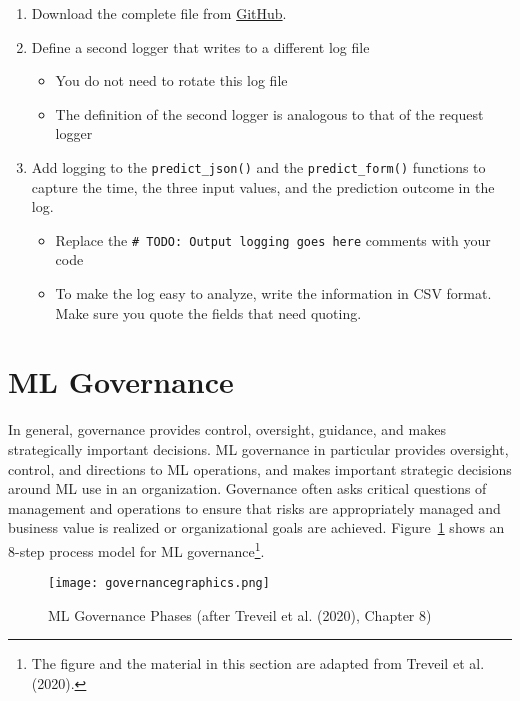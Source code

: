 \begin{exercisebox}
\begin{enumerate}
\item Download the complete file from \href{https://github.com/jevermann/busi4720-mlops/blob/main/flask_deploy_logging.py}{GitHub}.
\item Define a second logger that writes to a different log file
\begin{itemize}
  \item You do not need to rotate this log file
  \item The definition of the second logger is analogous to that of the request logger
\end{itemize}
\item Add logging to the \texttt{predict\_json()} and the \texttt{predict\_form()} functions to capture the time, the three input values, and the prediction outcome in the log.
\begin{itemize}
   \item Replace the \texttt{\# TODO: Output logging goes here} comments with your code
   \item To make the log easy to analyze, write the information in CSV format. Make sure you quote the fields that need quoting.
\end{itemize}
\end{enumerate}
\end{exercisebox}

\section{ML Governance}

In general, governance provides control, oversight, guidance, and makes strategically important decisions. ML governance in particular provides oversight, control, and directions to ML operations, and makes important strategic decisions around ML use in an organization. Governance often asks critical questions of management and operations to ensure that risks are appropriately managed and business value is realized or organizational goals are achieved. Figure~\ref{fig:mlgovernance} shows an 8-step process model for ML governance\footnote{The figure and the material in this section are adapted from Treveil et al. (2020).}.

\begin{figure}
\centering
\texttt{[image: governancegraphics.png]}
\caption[ML Governance Phases]{ML Governance Phases (after Treveil et al. (2020), Chapter 8)}
\label{fig:mlgovernance}
\end{figure}

